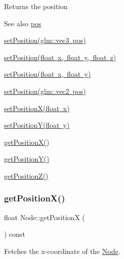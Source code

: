 \begin{DoxyReturn}{Returns}
the position 
\end{DoxyReturn}
\begin{DoxySeeAlso}{See also}
\mbox{\hyperlink{classsage_1_1Node_a26c32e5ec11e0ed7f33053ecac6830d5}{pos}} 

\mbox{\hyperlink{classsage_1_1Node_a12f5d88d221aa5db70c2bd53f6dc049a}{set\+Position(glm\+::vec3 pos)}} 

\mbox{\hyperlink{classsage_1_1Node_ad9899110e543c6b16997512e47c142c9}{set\+Position(float x, float y, float z)}} 

\mbox{\hyperlink{classsage_1_1Node_aaa8545c103ef1b35e5076dbedab93af5}{set\+Position(float x, float y)}} 

\mbox{\hyperlink{classsage_1_1Node_ae2731cefe38e706c2bf21afae6da18b3}{set\+Position(glm\+::vec2 pos)}} 

\mbox{\hyperlink{classsage_1_1Node_ae1dfc73d6122a95778d5d9db3d1fd913}{set\+Position\+X(float x)}} 

\mbox{\hyperlink{classsage_1_1Node_a5c97d36655f0daa71a5f6c715d2b0470}{set\+Position\+Y(float y)}} 

\mbox{\hyperlink{classsage_1_1Node_a17e92da5beaeb4b299c4e93729a22b1a}{get\+Position\+X()}} 

\mbox{\hyperlink{classsage_1_1Node_a26337a40b7da400233451b71e85759cc}{get\+Position\+Y()}} 

\mbox{\hyperlink{classsage_1_1Node_a0c6023aabdeeff9cf981ad81e6aaed9c}{get\+Position\+Z()}} 
\end{DoxySeeAlso}
\mbox{\label{classsage_1_1Node_a17e92da5beaeb4b299c4e93729a22b1a}} 
\subsubsection{\texorpdfstring{getPositionX()}{getPositionX()}}
{\footnotesize\ttfamily float Node\+::get\+PositionX (\begin{DoxyParamCaption}{ }\end{DoxyParamCaption}) const}



Fetches the x-\/coordinate of the \mbox{\hyperlink{classsage_1_1Node}{Node}}. 


